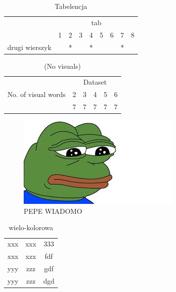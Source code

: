 \documentclass{article}
\begin{document}
    \begin{table}
        \centering
        \caption{Tabelencja}
        \label{Tabelencja}
        \begin{tabular}{c|c|c|c|c|c|c|c|c|}
            \cline{2-9}
             & \multicolumn{8}{|c|}{tab}\\
            \cline{2-9}
             & 1 & 2 & 3 & 4 & 5 & 6 & 7 & 8\\
            \hline
            \multicolumn{1}{|c|}{drugi wierszyk} & & * &  & * &  &  & * &\\
            \hline
        \end{tabular}
    \end{table}
		
		
		
\begin{table}
\begin{center}
\caption{ (No visuals) }
			\begin{tabular}{|c|c|c|c|c|c|}
			\hline
			\multirow{3}{*}{No. of visual words} & \multicolumn{5}{c|}{Dataset} \\ \cline{2-6}
			  & 2 & 3 & 4 & 5 & 6 \\ \hline
			  & 7 & 7 & 7 & 7 & 7 \\ \hline
			
\end{tabular}
\end{center}
\end{table}


\begin{figure}%
\centering
\caption{PEPE WIADOMO}%
\includegraphics[width=\columnwidth]{PEPE.jpg}%
\end{figure}



\begin{table}
\begin{center}
\caption{wielo-kolorowa}
\begin{tabular}{ccc}
xxx & xxx & 333 \\
xxx & xzx & fdf \\
yyy & zzz & gdf \\
yyy & zzz & dgd \\
\end{tabular}


\end{center}
\end{table}
\end{document}
